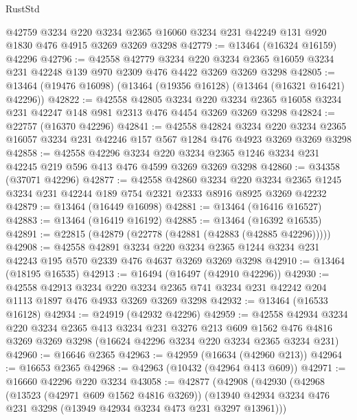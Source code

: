 \begin{lexlean}{RustStd}
\begin{coremodule}
    @42759
    @3234
    @220
    @3234
    @2365
    @16060
    @3234
    @231
    @42249
    @131
    @920
    @1830
    @476
    @4915
    @3269
    @3269
    @3298
@42779 := @13464 (@16324 @16159) @42296
@42796 := @42558
    @42779
    @3234
    @220
    @3234
    @2365
    @16059
    @3234
    @231
    @42248
    @139
    @970
    @2309
    @476
    @4422
    @3269
    @3269
    @3298
@42805 := @13464 (@19476 @16098) (@13464 (@19356 @16128) (@13464 (@16321 @16421) @42296))
@42822 := @42558
    @42805
    @3234
    @220
    @3234
    @2365
    @16058
    @3234
    @231
    @42247
    @148
    @981
    @2313
    @476
    @4454
    @3269
    @3269
    @3298
@42824 := @22757 (@16370 @42296)
@42841 := @42558
    @42824
    @3234
    @220
    @3234
    @2365
    @16057
    @3234
    @231
    @42246
    @157
    @567
    @1284
    @476
    @4923
    @3269
    @3269
    @3298
@42858 := @42558
    @42296
    @3234
    @220
    @3234
    @2365
    @1246
    @3234
    @231
    @42245
    @219
    @596
    @413
    @476
    @4599
    @3269
    @3269
    @3298
@42860 := @34358 (@37071 @42296)
@42877 := @42558
    @42860
    @3234
    @220
    @3234
    @2365
    @1245
    @3234
    @231
    @42244
    @189
    @754
    @2321
    @2333
    @8916
    @8925
    @3269
    @42232
@42879 := @13464 (@16449 @16098)
@42881 := @13464 (@16416 @16527)
@42883 := @13464 (@16419 @16192)
@42885 := @13464 (@16392 @16535)
@42891 := @22815 (@42879 (@22778 (@42881 (@42883 (@42885 @42296)))))
@42908 := @42558
    @42891
    @3234
    @220
    @3234
    @2365
    @1244
    @3234
    @231
    @42243
    @195
    @570
    @2339
    @476
    @4637
    @3269
    @3269
    @3298
@42910 := @13464 (@18195 @16535)
@42913 := @16494 (@16497 (@42910 @42296))
@42930 := @42558
    @42913
    @3234
    @220
    @3234
    @2365
    @741
    @3234
    @231
    @42242
    @204
    @1113
    @1897
    @476
    @4933
    @3269
    @3269
    @3298
@42932 := @13464 (@16533 @16128)
@42934 := @24919 (@42932 @42296)
@42959 := @42558
    @42934
    @3234
    @220
    @3234
    @2365
    @413
    @3234
    @231
    @3276
    @213
    @609
    @1562
    @476
    @4816
    @3269
    @3269
    @3298
    (@16624 @42296 @3234 @220 @3234 @2365 @3234 @231)
@42960 := @16646 @2365
@42963 := @42959 (@16634 (@42960 @213))
@42964 := @16653 @2365
@42968 := @42963 (@10432 (@42964 @413 @609))
@42971 := @16660 @42296 @220 @3234
@43058 := @42877
    (@42908
      (@42930
        (@42968
          (@13523 (@42971 @609 @1562 @4816 @3269))
          (@13940 @42934 @3234 @476 @231 @3298 (@13949 @42934 @3234 @473 @231 @3297 @13961)))

\end{coremodule}
\end{lexlean}
